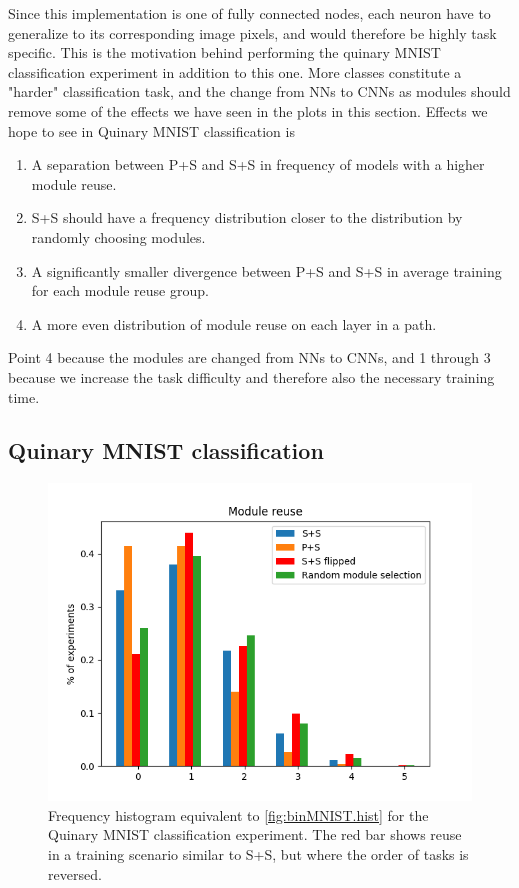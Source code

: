 Since this implementation is one of fully connected nodes, each neuron have to generalize to its corresponding image pixels, and would therefore be highly task specific. This is the motivation behind performing the quinary MNIST classification experiment in addition to this one. More classes constitute a "harder" classification task, and the change from NNs to CNNs as modules should remove some of the effects we have seen in the plots in this section. Effects we hope to see in Quinary MNIST classification is

\begin{enumerate}
    \item A separation between P+S and S+S in frequency of models with a higher module reuse.
    \item S+S should have a frequency distribution closer to the distribution by randomly choosing modules.
    \item A significantly smaller divergence between P+S and S+S in average training for each module reuse group. 
    \item A more even distribution of module reuse on each layer in a path.
\end{enumerate}


Point 4 because the modules are changed from NNs to CNNs, and 1 through 3 because we increase the task difficulty and therefore also the necessary training time. 

\subsection{Quinary MNIST classification}

\begin{figure}[t]
    \includegraphics[width=\textwidth]{Chapters/Experiments/first_path/figures/535MNIST_module_reuse.png}
    \caption{Frequency histogram equivalent to \ref{fig:binMNIST.hist} for the Quinary MNIST classification experiment. The red bar shows reuse in a training scenario similar to S+S, but where the order of tasks is reversed.}
    \label{fig:quinMNIST.hist}
\end{figure}


